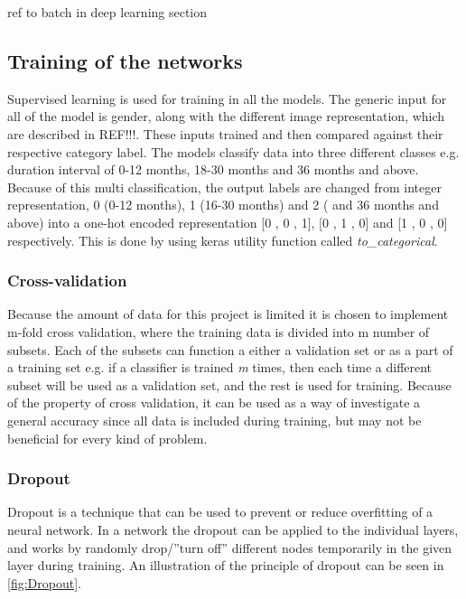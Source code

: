 ref to batch in deep learning section

 

 
 
\subsection{Training of the networks}
Supervised learning is used for training in all the models. The generic input for all of the model is gender, along with the different image representation, which are described in REF!!!. These inputs trained and then compared against their respective category label.   
The models classify data into three different classes e.g. duration interval of 0-12 months, 18-30 months and 36 months and above. Because of this multi classification, the output labels are changed from integer representation, 0 (0-12 months), 1 (16-30 months) and 2 ( and 36 months and above) into a one-hot encoded representation [0 , 0 , 1], [0 , 1 , 0] and [1 , 0 , 0] respectively. This is done by using keras utility function called \textit{to\_categorical}. 


\subsubsection{Cross-validation}
Because the amount of data for this project is limited it is chosen to implement m-fold cross validation, where the training data is divided into m number of subsets. Each of the subsets can function a either a validation set or as a part of a training set e.g. if a classifier is trained \textit{m} times, then each time a different subset will be used as a validation set, and the rest is used for training. \citep{Duda2000}
Because of the property of cross validation, it can be used as a way of investigate a general accuracy since all data is included during training, but may not be beneficial for every kind of problem. \citep{Duda2000}


\subsubsection{Dropout}
Dropout is a technique that can be used to prevent or reduce overfitting of a neural network. In a network the dropout can be applied to the individual layers, and works by randomly drop/”turn off” different nodes temporarily in the given layer during training. An illustration of the principle of dropout can be seen in \autoref{fig:Dropout}.  

